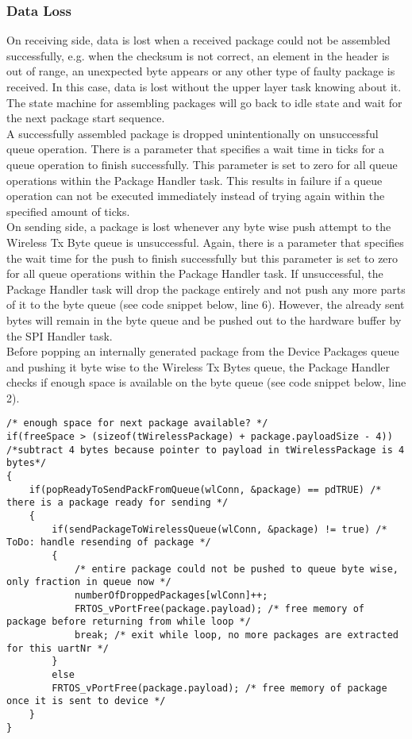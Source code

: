 \subsubsection{Data Loss}
On receiving side, data is lost when a received package could not be assembled successfully, e.g. when the checksum is not correct, an element in the header is out of range, an unexpected byte appears or any other type of faulty package is received. In this case, data is lost without the upper layer task knowing about it. The state machine for assembling packages will go back to idle state and wait for the next package start sequence.\\
A successfully assembled package is dropped unintentionally on unsuccessful queue operation. There is a parameter that specifies a wait time in ticks for a queue operation to finish successfully. This parameter is set to zero for all queue operations within the Package Handler task. This results in failure if a queue operation can not be executed immediately instead of trying again within the specified amount of ticks.\\
On sending side, a package is lost whenever any byte wise push attempt to the Wireless Tx Byte queue is unsuccessful. Again, there is a parameter that specifies the wait time for the push to finish successfully but this parameter is set to zero for all queue operations within the Package Handler task. If unsuccessful, the Package Handler task will drop the package entirely and not push any more parts of it to the byte queue (see code snippet below, line 6). However, the already sent bytes will remain in the byte queue and be pushed out to the hardware buffer by the SPI Handler task.\\
Before popping an internally generated package from the Device Packages queue and pushing it byte wise to the Wireless Tx Bytes queue, the Package Handler checks if enough space is available on the byte queue (see code snippet below, line 2).
\begin{lstlisting}
/* enough space for next package available? */
if(freeSpace > (sizeof(tWirelessPackage) + package.payloadSize - 4))  /*subtract 4 bytes because pointer to payload in tWirelessPackage is 4 bytes*/
{
    if(popReadyToSendPackFromQueue(wlConn, &package) == pdTRUE) /* there is a package ready for sending */
    {
        if(sendPackageToWirelessQueue(wlConn, &package) != true) /* ToDo: handle resending of package */
        {
            /* entire package could not be pushed to queue byte wise, only fraction in queue now */
            numberOfDroppedPackages[wlConn]++;
            FRTOS_vPortFree(package.payload); /* free memory of package before returning from while loop */
            break; /* exit while loop, no more packages are extracted for this uartNr */
        }
        else
        FRTOS_vPortFree(package.payload); /* free memory of package once it is sent to device */
    }
}
\end{lstlisting}
